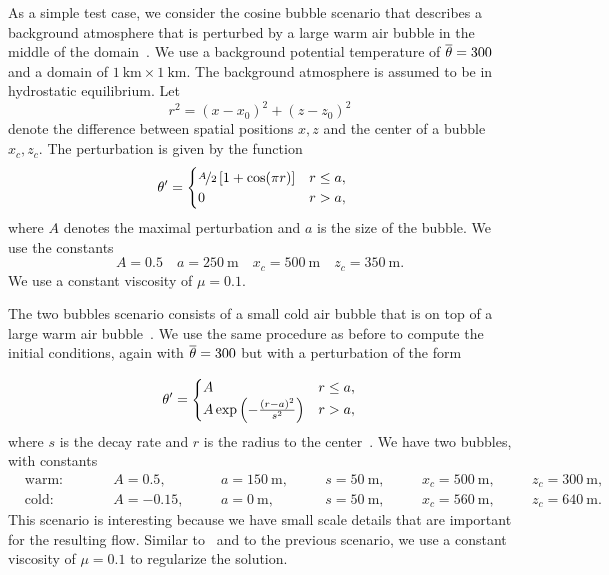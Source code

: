 As a simple test case, we consider the cosine bubble scenario that describes a background atmosphere that is perturbed by a large warm air bubble in the middle of the domain~\cite{giraldo2008study}.
We use a background potential temperature of $\overline{\theta} = 300$ and a domain of $\SI{1}{\km} \times \SI{1}{\km}$.
The background atmosphere is assumed to be in hydrostatic equilibrium.
Let
\begin{equation}
  \label{eq:radius}
  r^2 = (x - x_0)^2 + (z - z_0)^2
\end{equation}
denote the difference between spatial positions $x,z$ and the center of a bubble $x_c, z_c$.
The perturbation is given by the function
\begin{align}
  \label{eq:cos-pertubation}
  \theta' &= \begin{cases}
    \nicefrac{A}{2} \left[ 1 + \cos(\pi r) \right] & r \leq a, \\
    0 & r > a,
    \end{cases}
\end{align}
where $A$ denotes the maximal perturbation and $a$ is the size of the bubble.
We use the constants
\begin{equation}\label{eq:cosine-bubble}
  A = 0.5 \quad a = \SI{250}{\m} \quad x_c = \SI{500}{\m} \quad z_c = \SI{350}{\m}.
\end{equation}
We use a constant viscosity of $\mu = 0.1$.

The two bubbles scenario consists of a small cold air bubble that is on top of a large warm air bubble~\cite{robert1993bubble,muller2010adaptive}.
We use the same procedure as before to compute the initial conditions, again with $\overline{\theta} = 300$ but with a perturbation of the form

\begin{equation}
  \label{eq:bubbles-pertubation}
  \theta' =
  \begin{cases}
    A & r \leq a, \\
    A \exp \left( - \frac{(r-a)^2}{s^2} \right) & r > a,
    \end{cases}
\end{equation}
where $s$ is the decay rate and $r$  is the radius to the center~.
We have two bubbles, with constants
\begin{equation}
  \label{eq:bubbles-values}
\begin{alignedat}{6}
  & \text{warm:} \qquad && A = 0.5, \quad&& a = \SI{150}{\m}, \quad&& s = \SI{50}{\m}, \quad&& x_c = \SI{500}{\m,} \quad&& z_c = \SI{300}{\m},\\
  & \text{cold:} \qquad && A = -0.15, \quad&& a = \SI{0}{\m}, \quad&& s = \SI{50}{\m}, \quad&& x_c = \SI{560}{\m}, \quad&& z_c = \SI{640}{\m}.
  \end{alignedat}
\end{equation}
This scenario is interesting because we have small scale details that are important for the resulting flow.
Similar to~\cite{muller2010adaptive} and to the previous scenario, we use a constant viscosity of $\mu = 0.1$ to regularize the solution.

